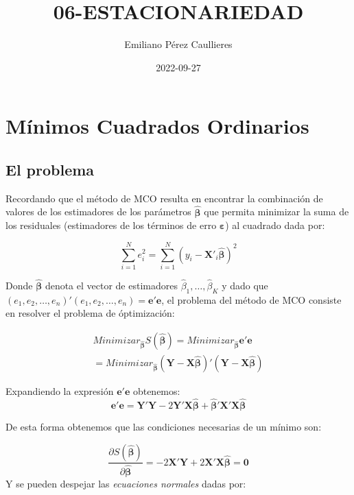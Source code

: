 \documentclass[
]{book}
\title{06-ESTACIONARIEDAD}
\author{Emiliano Pérez Caullieres}
\date{2022-09-27}
\begin{document}
\maketitle

{
\setcounter{tocdepth}{1}
\tableofcontents
}
\hypertarget{muxednimos-cuadrados-ordinarios}{%
\chapter{Mínimos Cuadrados Ordinarios}\label{muxednimos-cuadrados-ordinarios}}

\hypertarget{el-problema}{%
\section{El problema}\label{el-problema}}

Recordando que el método de MCO resulta en encontrar la combinación de valores de los estimadores de los parámetros \(\hat{\boldsymbol{\beta}}\) que permita minimizar la suma de los residuales (estimadores de los términos de erro \(\boldsymbol{\varepsilon}\)) al cuadrado dada por:

\[
    \sum^{N}_{i=1}{e^2_i} = \sum^{N}_{i = 1}{(y_i - \mathbf{X}'_i \hat{\boldsymbol{\beta}})^2}
\]

Donde \(\hat{\boldsymbol{\beta}}\) denota el vector de estimadores \(\hat{\beta}_1, \ldots, \hat{\beta}_K\) y dado que \((e_1, e_2, \ldots, e_n)'(e_1, e_2, \ldots, e_n) = {\mathbf{e'e}}\), el problema del método de MCO consiste en resolver el problema de óptimización:

\begin{eqnarray*}
Minimizar_{\hat{\boldsymbol \beta}} S(\hat{\boldsymbol \beta})  =  Minimizar_{\hat{\boldsymbol \beta}} \mathbf{e'e} \\
    =  Minimizar_{\hat{\boldsymbol \beta}} (\mathbf{Y}-\mathbf{X}\hat{\boldsymbol \beta})'(\mathbf{Y}-\mathbf{X}\hat{\boldsymbol \beta})
\end{eqnarray*}

Expandiendo la expresión \(\mathbf{e'e}\) obtenemos:
\[
    \mathbf{e'e} = \mathbf{Y'Y} - 2 \mathbf{Y'X} \hat{\boldsymbol \beta} + \hat{\boldsymbol \beta}' \mathbf{X'X}\hat{\boldsymbol \beta}
\]

De esta forma obtenemos que las condiciones necesarias de un mínimo son:

\[
    \frac{\partial S(\hat{\boldsymbol \beta})}{\partial \hat{\boldsymbol \beta}} = -2{\mathbf{X'Y}} + 2{\mathbf{X'X}} \hat{\boldsymbol{\beta}} = \mathbf{0}
\]
Y se pueden despejar las \textit{ecuaciones normales} dadas por:
\end{document}
